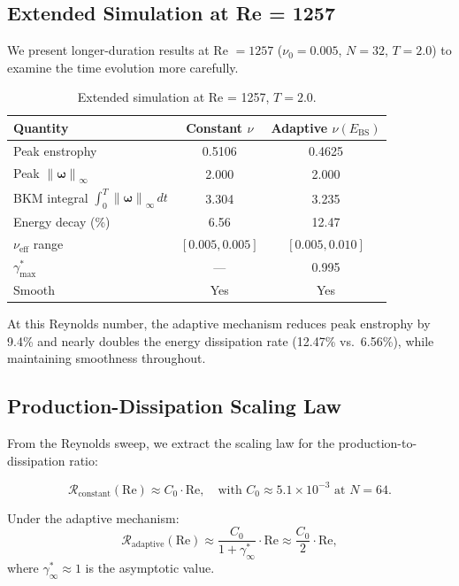 \documentclass[12pt, a4paper]{article}
\newcommand{\norm}[1]{\left\| #1 \right\|}
\newcommand{\Ebs}{E_{\mathrm{BS}}}
\newcommand{\gammastar}{\gamma^*}
\begin{document}
\subsection{Extended Simulation at Re = 1257}

We present longer-duration results at Re $= 1257$ ($\nu_0 = 0.005$,
$N = 32$, $T = 2.0$) to examine the time evolution more carefully.

\begin{table}[H]
\centering
\caption{Extended simulation at Re = 1257, $T = 2.0$.}
\label{tab:re1257}
\begin{tabular}{@{}lcc@{}}
\toprule
Quantity & Constant $\nu$ & Adaptive $\nu(\Ebs)$ \\
\midrule
Peak enstrophy  & 0.5106 & 0.4625 \\
Peak $\norm{\boldsymbol{\omega}}_\infty$ & 2.000 & 2.000 \\
BKM integral $\int_0^T \norm{\boldsymbol{\omega}}_\infty \, dt$ & 3.304 & 3.235 \\
Energy decay (\%) & 6.56 & 12.47 \\
$\nu_{\mathrm{eff}}$ range & $[0.005, 0.005]$ & $[0.005, 0.010]$ \\
$\gammastar_{\max}$ & --- & 0.995 \\
Smooth & Yes & Yes \\
\bottomrule
\end{tabular}
\end{table}

At this Reynolds number, the adaptive mechanism reduces peak enstrophy
by 9.4\% and nearly doubles the energy dissipation rate (12.47\% vs.~6.56\%),
while maintaining smoothness throughout.

\subsection{Production-Dissipation Scaling Law}

From the Reynolds sweep, we extract the scaling law for the
production-to-dissipation ratio:

\begin{equation}\label{eq:PD_scaling}
\mathcal{R}_{\mathrm{constant}}(\mathrm{Re}) \approx C_0 \cdot \mathrm{Re},
\quad\text{with } C_0 \approx 5.1 \times 10^{-3} \text{ at } N = 64.
\end{equation}

Under the adaptive mechanism:
\begin{equation}\label{eq:PD_adaptive_scaling}
\mathcal{R}_{\mathrm{adaptive}}(\mathrm{Re}) \approx
\frac{C_0}{1 + \gammastar_\infty} \cdot \mathrm{Re}
\approx \frac{C_0}{2} \cdot \mathrm{Re},
\end{equation}
where $\gammastar_\infty \approx 1$ is the asymptotic value.
\end{document}
